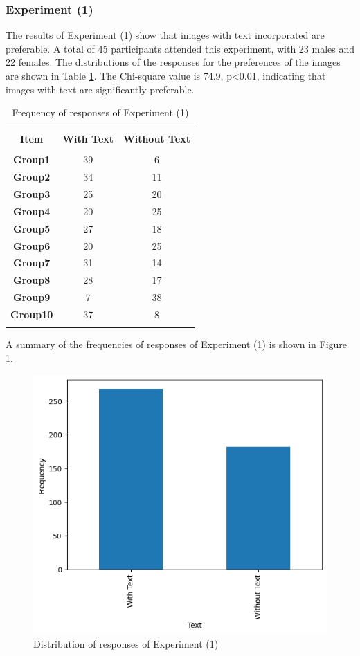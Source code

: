 \documentclass[a4paper]{article}
\begin{document}
\subsubsection{Experiment (1)}
The results of Experiment (1) show that images with text incorporated are preferable. A total of 45 participants attended this experiment, with 23 males and 22 females. The distributions of the responses for the preferences of the images are shown in Table \ref{tab:Experiment1}. The Chi-square value is 74.9, p<0.01, indicating that images with text are significantly preferable.  


\begin{table}
    \centering
\caption{Frequency of responses of Experiment (1)}
\label{tab:Experiment1}
    \begin{tabular}{ccc} 
    \hline \\[-1.8ex] 
 \textbf{Item}& \textbf{With Text}&\textbf{Without Text}\\ 
 \hline \\[-1.8ex]
         \textbf{Group1}&  39& 6\\ 
         \textbf{Group2}&  34& 11\\ 
         \textbf{Group3}&  25& 20\\ 
         \textbf{Group4}&  20& 25\\ 
         \textbf{Group5}&  27& 18\\ 
         \textbf{Group6}&  20& 25\\ 
         \textbf{Group7}&  31& 14\\ 
         \textbf{Group8}&  28& 17\\ 
         \textbf{Group9}&  7& 38\\ 
         \textbf{Group10}&  37& 8\\ 
         \hline \\ [-1.8ex] 
    \end{tabular}  
\end{table}

A summary of the frequencies of responses of Experiment (1) is shown in Figure \ref{fig:DistExperiment3}.

\begin{figure}
    \centering
    \includegraphics[width=0.75\linewidth]{distexperiment3.png}
    \caption{Distribution of responses of Experiment (1)}
    \label{fig:DistExperiment3}
\end{figure}
\end{document}
